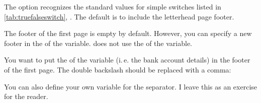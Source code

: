 The option recognizes the standard values for simple switches listed in
\autoref{tab:truefalseswitch}, . The default
is to include the letterhead page footer.
\EndIndexGroup


\begin{Declaration}
\end{Declaration}%
%
The footer of the first page is empty by default.
However, you can specify a new footer
in the  of the  variable. \KOMAScript{}
does not use the  of the variable.

%
\begin{Example}
  You want to put the  of the  variable
  (i.\,e. the bank account details) in the footer of the first page. The
  double backslash should be replaced with a comma:
\begin{lstcode}
\end{lstcode}
  You can also define your own variable for the separator. I leave
  this as an exercise for the reader.


\end{Example}

